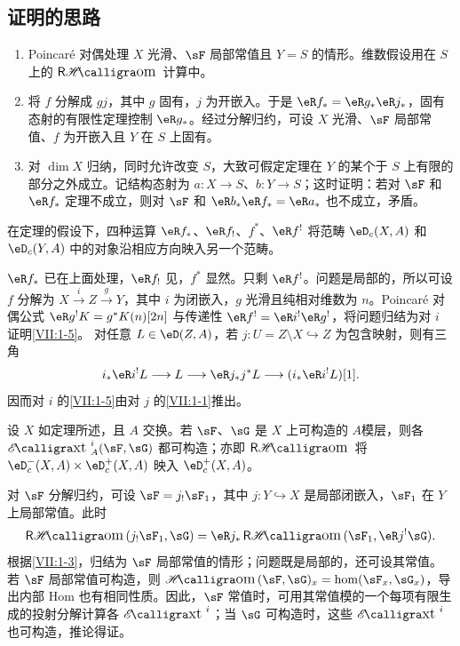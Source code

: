\subsection{证明的思路}\label{VII:1-4}
\begin{enumerate}[\indent a)]
\item Poincaré 对偶处理 $X$ 光滑、$\sF$ 局部常值且 $Y=S$ 的情形。维数假设用在 $S$ 上的 $\rHom$ 计算中。
\item 将 $f$ 分解成 $gj$，其中 $g$ 固有，$j$ 为开嵌入。于是 $\eR f_\ast=\eR g_\ast\eR j_\ast$，固有态射的有限性定理控制 $\eR g_\ast$。经过分解归约，可设 $X$ 光滑、$\sF$ 局部常值、$f$ 为开嵌入且 $Y$ 在 $S$ 上固有。
\item 对 $\dim X$ 归纳，同时允许改变 $S$，大致可假定定理在 $Y$ 的某个于 $S$ 上有限的部分之外成立。记结构态射为 $a:X\to S$、$b:Y\to S$；这时证明：若对 $\sF$ 和 $\eR f_\ast$ 定理不成立，则对 $\sF$ 和 $\eR b_\ast\eR f_\ast=\eR a_\ast$ 也不成立，矛盾。
\end{enumerate}
\begin{corollary_}\label{VII:1-5}
在定理的假设下，四种运算 $\eR f_\ast$、$\eR f_!$、$f^\ast$、$\eR f^!$ 将范畴 $\eD_c(X,A)$ 和 $\eD_c(Y,A)$ 中的对象沿相应方向映入另一个范畴。
\end{corollary_}
$\eR f_\ast$ 已在上面处理，$\eR f_!$ 见\cite[XVII 5.3]{sga4}，$f^\ast$ 显然。只剩 $\eR f^!$。问题是局部的，所以可设 $f$ 分解为 $X\xrightarrow i Z\xrightarrow gY$，其中 $i$ 为闭嵌入，$g$ 光滑且纯相对维数为 $n$。Poincaré 对偶公式
$\eR g^!K=g^\ast K(n)[2n]$ 与传递性 $\eR f^!=\eR i^!\eR g^!$，将问题归结为对 $i$ 证明\ref{VII:1-5}。
对任意 $L\in\eD(Z,A)$，若 $j:U=Z\setminus X\hookrightarrow Z$ 为包含映射，则有三角
\[
 i_\ast\eR i^!L\longrightarrow L\longrightarrow\eR j_\ast j^\ast L\longrightarrow(i_\ast\eR i^!L)[1].
\]
因而对 $i$ 的\ref{VII:1-5}由对 $j$ 的\ref{VII:1-1}推出。
\begin{corollary_}\label{VII:1-6}
设 $X$ 如定理所述，且 $A$ 交换。若 $\sF$、$\sG$ 是 $X$ 上可构造的 $A$模层，则各 $\Ext_A^i(\sF,\sG)$ 都可构造；亦即 $\rHom$ 将 $\eD_c^-(X,A)\times\eD_c^+(X,A)$ 映入 $\eD_c^+(X,A)$。
\end{corollary_}
对 $\sF$ 分解归约，可设 $\sF=j_!\sF_1$，其中 $j:Y\hookrightarrow X$ 是局部闭嵌入，$\sF_1$ 在 $Y$ 上局部常值。此时
\[
 \rHom(j_!\sF_1,\sG)=\eR j_\ast\rHom(\sF_1,\eR j^!\sG).
\]
根据\ref{VII:1-3}，归结为 $\sF$ 局部常值的情形；问题既是局部的，还可设其常值。若 $\sF$ 局部常值可构造，则 $\Hom(\sF,\sG)_x=\hom(\sF_x,\sG_x)$，导出内部 Hom 也有相同性质。因此，$\sF$ 常值时，可用其常值模的一个每项有限生成的投射分解计算各 $\Ext^i$；当 $\sG$ 可构造时，这些 $\Ext^i$ 也可构造，推论得证。
